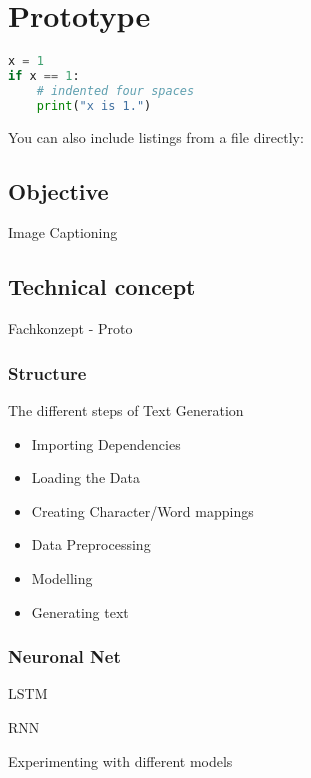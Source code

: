 \chapter{Prototype}\label{ch:proto}

\begin{lstlisting}[language=Python,caption={This is an example of inline listing},captionpos=b]
x = 1
if x == 1:
    # indented four spaces
    print("x is 1.")

\end{lstlisting}

You can also include listings from a file directly:



\section{Objective}

Image Captioning

\section{Technical concept}

Fachkonzept - Proto

\subsection{Structure}

The different steps of Text Generation

\begin{itemize}
\item Importing Dependencies
\item Loading the Data
\item Creating Character/Word mappings
\item Data Preprocessing
\item Modelling
\item Generating text
\end{itemize}

\subsection{Neuronal Net}\label{ss:nn}

LSTM

RNN


Experimenting with different models

